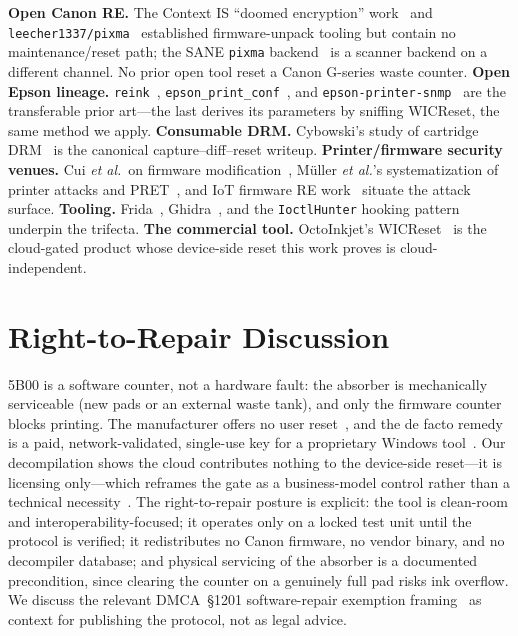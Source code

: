 \documentclass[conference]{IEEEtran}
\begin{document}
\textbf{Open Canon RE.} The Context IS ``doomed encryption''
work~\cite{contextis-canon} and \texttt{leecher1337/pixma}~\cite{leecher-pixma}
established firmware-unpack tooling but contain no maintenance/reset path;
the SANE \texttt{pixma} backend~\cite{sane-pixma} is a scanner backend on
a different channel. No prior open tool reset a Canon G-series waste
counter. \textbf{Open Epson lineage.} \texttt{reink}~\cite{reink-elena},
\texttt{epson\_print\_conf}~\cite{ircama-epson-print-conf}, and
\texttt{epson-printer-snmp}~\cite{zedeldi-epson-snmp} are the transferable
prior art---the last derives its parameters by sniffing WICReset, the same
method we apply. \textbf{Consumable DRM.} Cybowski's study of cartridge
DRM~\cite{cybowski2022drm} is the canonical capture--diff--reset writeup.
\textbf{Printer/firmware security venues.} Cui \emph{et al.}\ on firmware
modification~\cite{cui2013firmware}, M{\"u}ller \emph{et al.}'s
systematization of printer attacks and PRET~\cite{mueller2017sok}, and IoT
firmware RE work~\cite{shwartz2018iot,bakhshi2024firmware} situate the
attack surface. \textbf{Tooling.} Frida~\cite{frida},
Ghidra~\cite{ghidra}, and the \texttt{IoctlHunter} hooking
pattern~\cite{ioctlhunter} underpin the trifecta. \textbf{The commercial
tool.} OctoInkjet's WICReset~\cite{octoinkjet-wicreset} is the cloud-gated
product whose device-side reset this work proves is cloud-independent.

\section{Right-to-Repair Discussion}
\label{sec:r2r}

5B00 is a software counter, not a hardware fault: the absorber is
mechanically serviceable (new pads or an external waste tank), and only
the firmware counter blocks printing. The manufacturer offers no user
reset~\cite{canon-5b00-support}, and the de facto remedy is a paid,
network-validated, single-use key for a proprietary Windows
tool~\cite{octoinkjet-wicreset}. Our decompilation shows the cloud
contributes nothing to the device-side reset---it is licensing
only---which reframes the gate as a business-model control rather than a
technical necessity~\cite{anderson2020security,anderson2003crypto}. The
right-to-repair posture is explicit: the tool is clean-room and
interoperability-focused; it operates only on a locked test unit until the
protocol is verified; it redistributes no Canon firmware, no vendor
binary, and no decompiler database; and physical servicing of the absorber
is a documented precondition, since clearing the counter on a genuinely
full pad risks ink overflow. We discuss the relevant DMCA~\S1201
software-repair exemption framing~\cite{crs-dmca-1201} as context for
publishing the protocol, not as legal advice.
\end{document}
